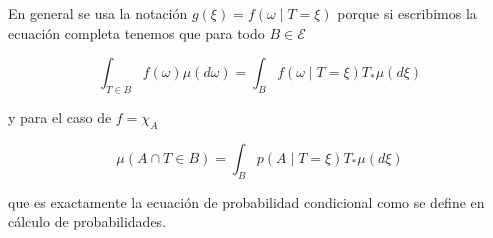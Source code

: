 \documentclass[main.tex]{subfiles}
\begin{document}
En general se usa la notación $g(\xi) = f\left(\omega \mid T=\xi\right)$ porque si escribimos la ecuación completa tenemos que para todo $B\in\mathcal{E}$

\begin{equation*}
	\int_{T\in B} f(\omega)\mu(d\omega)
	= \int _B f(\omega \mid T=\xi)T_*\mu(d\xi)
\end{equation*}

y para el caso de $f=\chi_A$

\begin{equation*}
\mu\left(A\cap T\in B\right) = 
	\int _B p(A \mid T=\xi)T_*\mu(d\xi) 	
\end{equation*}

que es exactamente la ecuación de probabilidad condicional como se define en cálculo de probabilidades.
\end{document}
